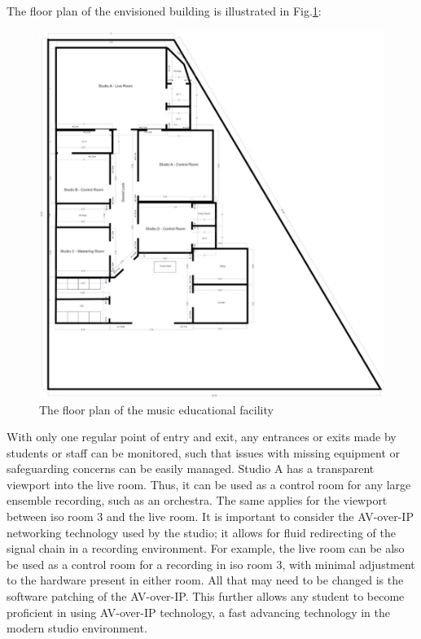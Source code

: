 \documentclass[10pt, twocolumn]{article}
\begin{document}
        The floor plan of the envisioned building is illustrated in Fig.\ref{floorplan}:
        \begin{figure}
            \centering
            \centerline{\includegraphics[scale = 0.8]{resources/floorplan.png}}
            \caption{The floor plan of the music educational facility}
            \label{floorplan}
        \end{figure}
        With only one regular point of entry and exit, any entrances or exits made by students or staff can be monitored, such that issues with missing equipment or safeguarding concerns can be easily managed.
        Studio A has a transparent viewport into the live room.
        Thus, it can be used as a control room for any large ensemble recording, such as an orchestra.
        The same applies for the viewport between iso room 3 and the live room.
        It is important to consider the AV-over-IP networking technology used by the studio; it allows for fluid redirecting of the signal chain in a recording environment.
        For example, the live room can be also be used as a control room for a recording in iso room 3, with minimal adjustment to the hardware present in either room.
        All that may need to be changed is the software patching of the AV-over-IP.
        This further allows any student to become proficient in using AV-over-IP technology, a fast advancing technology in the modern studio environment.
        
\end{document}
